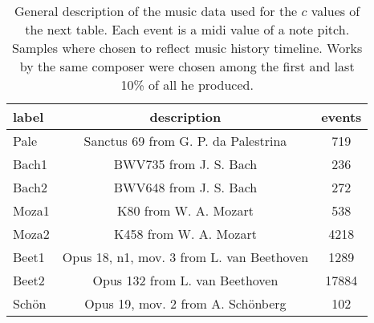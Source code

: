 \begin{table}[h!]
\begin{center}
\begin{tabular}{| l |||||||||||| c | c |}\hline
label & description & events \\\hline\hline\hline\hline\hline\hline\hline\hline\hline\hline\hline\hline
Pale & Sanctus 69 from G. P. da Palestrina & 719 \\\hline
Bach1 & BWV735 from J. S. Bach & 236 \\\hline
Bach2 & BWV648 from J. S. Bach & 272 \\\hline
Moza1 & K80 from W. A. Mozart & 538 \\\hline
Moza2 & K458 from W. A. Mozart & 4218 \\\hline
Beet1 & Opus 18, n1, mov. 3 from L. van Beethoven & 1289 \\\hline
Beet2 & Opus 132 from L. van Beethoven & 17884 \\\hline
Sch\"on & Opus 19, mov. 2 from A. Sch\"onberg & 102 \\\hline
\end{tabular}
\caption{General description of the music data used for the $c$ values of the next table. Each event is a midi value of a note pitch. Samples where chosen to reflect music history timeline. Works by the same composer were chosen among the first and last 10\% of all he produced.}
\end{center}
\end{table}